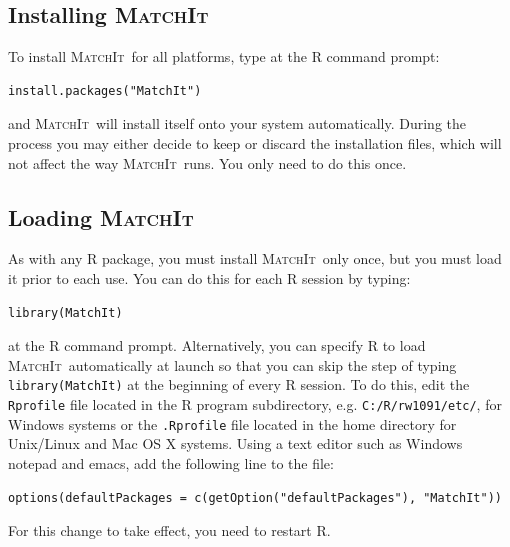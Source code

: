 \documentclass[oneside,letterpaper,titlepage]{article}
\newcommand{\MatchIt}{\textsc{MatchIt}}
\begin{document}
\subsection{Installing \MatchIt}

To install \MatchIt\ for all platforms, type at the R command prompt:
\begin{verbatim}
install.packages("MatchIt")
\end{verbatim}
and \MatchIt\ will install itself onto your system automatically.
During the process you may either decide to keep or discard the
installation files, which will not affect the way \MatchIt\ runs.  You
only need to do this once.

\subsection{Loading \MatchIt}
As with any R package, you must install \MatchIt\ only once, but you
must load it prior to each use.  You can do this for each R session by
typing:
\begin{verbatim}
library(MatchIt) 
\end{verbatim}
at the R command prompt.  Alternatively, you can specify R to load
\MatchIt\ automatically at launch so that you can skip the step of
typing {\tt library(MatchIt)} at the beginning of every R session.  To
do this, edit the {\tt Rprofile} file located in the R program
subdirectory, e.g. \texttt{C:/R/rw1091/etc/}, for Windows systems or
the {\tt .Rprofile} file located in the home directory for Unix/Linux
and Mac OS X systems.  Using a text editor such as Windows notepad and
emacs, add the following line to the file:
\begin{verbatim}
options(defaultPackages = c(getOption("defaultPackages"), "MatchIt"))
\end{verbatim}
For this change to take effect, you need to restart R.

%
\end{document}
